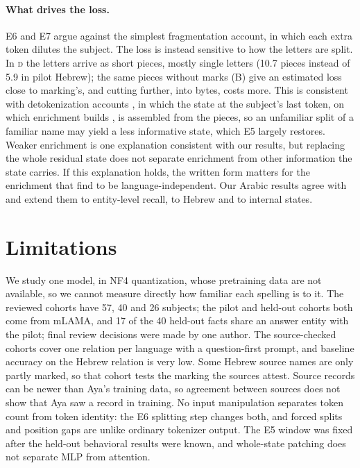\documentclass[11pt]{article}
\newcommand{\D}{\textsc{d}}
\newcommand{\cB}{\textsf{B}}
\begin{document}
\paragraph{What drives the loss.} E6 and E7 argue against the simplest
fragmentation account, in which each extra token dilutes the subject. The loss is
instead sensitive to how the letters are split. In \D{} the letters arrive
as short pieces, mostly single letters (10.7 pieces instead of 5.9 in pilot
Hebrew); the same pieces without marks (\cB) give an estimated loss close to
marking's, and cutting further, into bytes, costs more. This is consistent with
detokenization accounts \citep{kaplan-etal-2025-tokens,feucht-etal-2024-token},
in which the state at the subject's last token, on which enrichment builds
\citep{geva-etal-2023-dissecting}, is assembled from the pieces, so an unfamiliar
split of a familiar name may yield a less informative state, which E5 largely
restores. Weaker enrichment is one explanation consistent with our results, but
replacing the whole residual state does not separate enrichment from other
information the state carries. If this explanation holds, the written form
matters for the enrichment that \citet{fierro-etal-2025-multilingual} find to be
language-independent.  Our Arabic results agree with
\citet{inoue-etal-2026-diacritics} and extend them to entity-level recall, to
Hebrew and to internal states.

\section{Limitations}
\label{sec:limits}
We study one model, in NF4 quantization, whose pretraining data are not
available, so we cannot measure directly how familiar each spelling is to it.
The reviewed cohorts have 57, 40 and 26 subjects; the pilot and held-out cohorts
both come from mLAMA, and 17 of the 40 held-out facts share an answer entity with
the pilot; final review decisions were made by one author. The source-checked cohorts cover one relation per language with a
question-first prompt, and baseline accuracy on the Hebrew relation is very low. Some
Hebrew source names are only partly marked, so that cohort tests the marking the
sources attest. Source records can be newer than Aya's training
data, so agreement between sources does not show that Aya saw a record in
training. No input manipulation
separates token count from token identity: the E6 splitting step changes both,
and forced splits and position gaps are unlike ordinary tokenizer output. The E5 window was fixed after the held-out behavioral results were
known, and whole-state patching does not separate MLP from attention.
\end{document}
